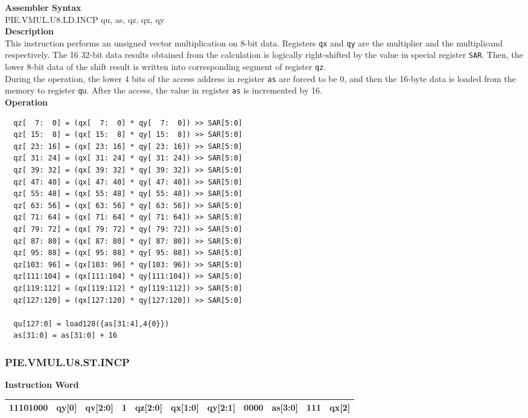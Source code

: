 \textbf{Assembler Syntax} \\
PIE.VMUL.U8.LD.INCP qu, as, qz, qx, qy \\
\textbf{Description} \\
This instruction performs an unsigned vector multiplication on 8-bit data. Registers \lstinline{qx} and \lstinline{qy} are the multiplier and the multiplicand respectively. The 16 32-bit data results obtained from the calculation is logically right-shifted by the value in special register \lstinline{SAR}. Then, the lower 8-bit data of the shift result is written into corresponding segment of register \lstinline{qz}. \\ During the operation, the lower 4 bits of the access address in register \lstinline{as} are forced to be 0, and then the 16-byte data is loaded from the memory to register \lstinline{qu}. After the access, the value in register \lstinline{as} is incremented by 16.\\
\textbf{Operation}
\begin{lstlisting}
  qz[  7:  0] = (qx[  7:  0] * qy[  7:  0]) >> SAR[5:0]
  qz[ 15:  8] = (qx[ 15:  8] * qy[ 15:  8]) >> SAR[5:0]
  qz[ 23: 16] = (qx[ 23: 16] * qy[ 23: 16]) >> SAR[5:0]
  qz[ 31: 24] = (qx[ 31: 24] * qy[ 31: 24]) >> SAR[5:0]
  qz[ 39: 32] = (qx[ 39: 32] * qy[ 39: 32]) >> SAR[5:0]
  qz[ 47: 40] = (qx[ 47: 40] * qy[ 47: 40]) >> SAR[5:0]
  qz[ 55: 48] = (qx[ 55: 48] * qy[ 55: 48]) >> SAR[5:0]
  qz[ 63: 56] = (qx[ 63: 56] * qy[ 63: 56]) >> SAR[5:0]
  qz[ 71: 64] = (qx[ 71: 64] * qy[ 71: 64]) >> SAR[5:0]
  qz[ 79: 72] = (qx[ 79: 72] * qy[ 79: 72]) >> SAR[5:0]
  qz[ 87: 80] = (qx[ 87: 80] * qy[ 87: 80]) >> SAR[5:0]
  qz[ 95: 88] = (qx[ 95: 88] * qy[ 95: 88]) >> SAR[5:0]
  qz[103: 96] = (qx[103: 96] * qy[103: 96]) >> SAR[5:0]
  qz[111:104] = (qx[111:104] * qy[111:104]) >> SAR[5:0]
  qz[119:112] = (qx[119:112] * qy[119:112]) >> SAR[5:0]
  qz[127:120] = (qx[127:120] * qy[127:120]) >> SAR[5:0]

  qu[127:0] = load128({as[31:4],4{0}})
  as[31:0] = as[31:0] + 16
\end{lstlisting}

\newpage
\subsubsection{PIE.VMUL.U8.ST.INCP}\label{instruction:PIEVMULU8STINCP}
\setlength\tabcolsep{6pt}
\textbf{Instruction Word} \\
\begin{tabular}{|c|c|c|c|c|c|c|c|c|c|c|}
	\hline
	11101000 & qy[0] & qv[2:0] & 1 & qz[2:0] & qx[1:0] & qy[2:1] & 0000 & as[3:0] & 111 & qx[2] \\
	\hline
\end{tabular}

